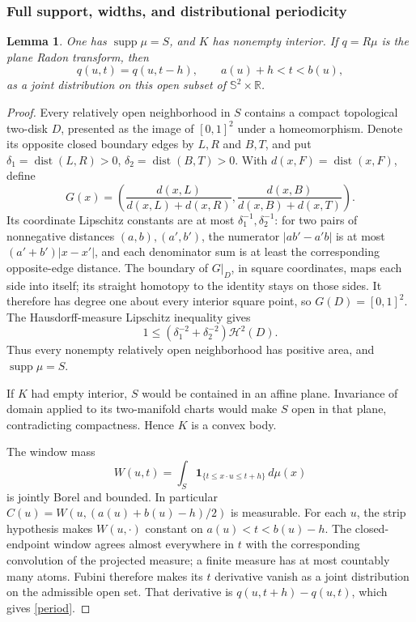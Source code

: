 \documentclass[11pt]{article}
\newtheorem{lemma}[theorem]{Lemma}
\newcommand{\R}{\mathbb R}
\newcommand{\Sph}{\mathbb S}
\newcommand{\HH}{\mathcal H}
\newcommand{\supp}{\operatorname{supp}}
\begin{document}
\subsubsection{Full support, widths, and distributional periodicity}
\begin{lemma}\label{lem:elementary}
One has $\supp\mu=S$, and $K$ has nonempty interior. If $q=R\mu$ is the plane Radon transform, then
\begin{equation}\label{period}
 q(u,t)=q(u,t-h),\qquad a(u)+h<t<b(u),
\end{equation}
as a joint distribution on this open subset of $\Sph^2\times\R$.
\end{lemma}
\begin{proof}

Every relatively open neighborhood in $S$ contains a compact topological two-disk $D$, presented as the image of $[0,1]^2$ under a homeomorphism. Denote its opposite closed boundary edges by $L,R$ and $B,T$, and put $\delta_1=\operatorname{dist}(L,R)>0$, $\delta_2=\operatorname{dist}(B,T)>0$. With $d(x,F)=\operatorname{dist}(x,F)$, define
\[
 G(x)=\left(\frac{d(x,L)}{d(x,L)+d(x,R)},
 \frac{d(x,B)}{d(x,B)+d(x,T)}\right).
\]
Its coordinate Lipschitz constants are at most $\delta_1^{-1},\delta_2^{-1}$: for two pairs of nonnegative distances $(a,b),(a',b')$, the numerator $|ab'-a'b|$ is at most $(a'+b')|x-x'|$, and each denominator sum is at least the corresponding opposite-edge distance. The boundary of $G|_D$, in square coordinates, maps each side into itself; its straight homotopy to the identity stays on those sides. It therefore has degree one about every interior square point, so $G(D)=[0,1]^2$. The Hausdorff-measure Lipschitz inequality gives
\[
 1\le(\delta_1^{-2}+\delta_2^{-2})\HH^2(D).
\]
Thus every nonempty relatively open neighborhood has positive area, and $\supp\mu=S$.

If $K$ had empty interior, $S$ would be contained in an affine plane. Invariance of domain applied to its two-manifold charts would make $S$ open in that plane, contradicting compactness. Hence $K$ is a convex body.

The window mass
\[
 W(u,t)=\int_S\mathbf1_{\{t\le x\cdot u\le t+h\}}\,d\mu(x)
\]
is jointly Borel and bounded. In particular $C(u)=W(u,(a(u)+b(u)-h)/2)$ is measurable. For each $u$, the strip hypothesis makes $W(u,\cdot)$ constant on $a(u)<t<b(u)-h$. The closed-endpoint window agrees almost everywhere in $t$ with the corresponding convolution of the projected measure; a finite measure has at most countably many atoms. Fubini therefore makes its $t$ derivative vanish as a joint distribution on the admissible open set. That derivative is $q(u,t+h)-q(u,t)$, which gives \eqref{period}.
\end{proof}
\end{document}
